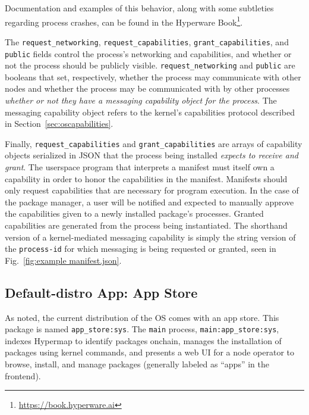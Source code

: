 \documentclass[runningheads]{llncs}
\begin{document}
Documentation and examples of this behavior, along with some subtleties regarding process crashes, can be found in the Hyperware Book\footnote{\url{https://book.hyperware.ai}}.

The \verb|request_networking|, \verb|request_capabilities|, \verb|grant_capabilities|, and \verb|public| fields control the process's networking and capabilities, and whether or not the process should be publicly visible.
\verb|request_networking| and \verb|public| are booleans that set, respectively, whether the process may communicate with other nodes and whether the process may be communicated with by other processes \textit{whether or not they have a messaging capability object for the process}.
The messaging capability object refers to the kernel's capabilities protocol described in Section~\ref{sec:oscapabilities}.

Finally, \verb|request_capabilities| and \verb|grant_capabilities| are arrays of capability objects serialized in JSON that the process being installed \textit{expects to receive and grant}.
The userspace program that interprets a manifest must itself own a capability in order to honor the capabilities in the manifest.
Manifests should only request capabilities that are necessary for program execution.
In the case of the package manager, a user will be notified and expected to manually approve the capabilities given to a newly installed package's processes.
Granted capabilities are generated from the process being instantiated.
The shorthand version of a kernel-mediated messaging capability is simply the string version of the \verb|process-id| for which messaging is being requested or granted, seen in Fig.~\ref{fig:example manifest.json}.

\subsection{Default-distro App: App Store}
\label{sec:appstore}

As noted, the current distribution of the OS comes with an app store.
This package is named \verb|app_store:sys|.
The \verb|main| process, \verb|main:app_store:sys|, indexes Hypermap to identify packages onchain, manages the installation of packages using kernel commands, and presents a web UI for a node operator to browse, install, and manage packages (generally labeled as ``apps'' in the frontend).
\end{document}
